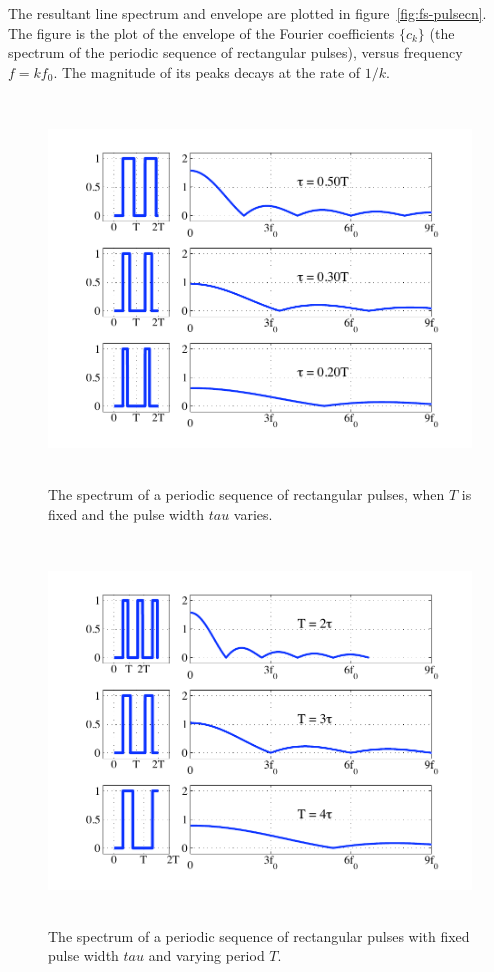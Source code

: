 The resultant line spectrum and envelope are plotted in
figure~\ref{fig:fs-pulsecn}.  The figure is the plot of the envelope
of the Fourier coefficients $\{c_k\}$ (the spectrum of the periodic
sequence of rectangular pulses), versus frequency $f=kf_0$. The
magnitude of its peaks decays at the rate of $1/k$.

\begin{figure}
\centerline{\includegraphics[height=4in]{ch-physical/fs_pulsecntau}}
\caption[Spectrum of a periodic sequence of rectangular 
pulses; varying pulse width]{The spectrum of a periodic sequence of
rectangular pulses, when $T$ is fixed and the pulse width $tau$
varies.
\label{fig:fs-pulsecntau}}
\end{figure}

\begin{figure}
\centerline{\includegraphics[height=4in]{ch-physical/fs_pulsecnT}}
\caption[Spectrum of a periodic sequence of rectangular  
pulses; varying period]{The spectrum of a periodic sequence of
rectangular pulses with fixed pulse width $tau$ and varying period
$T$.
\label{fig:fs-pulsecnT}}
\end{figure}

